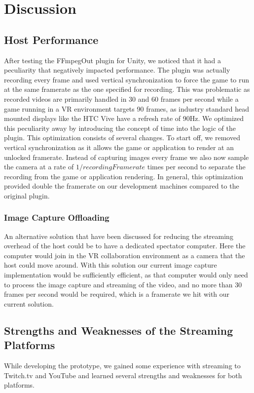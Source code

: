 \section{Discussion}
\subsection{Host Performance}
After testing the FFmpegOut plugin for Unity, we noticed that it had a peculiarity that negatively impacted performance. The plugin was actually recording every frame and used vertical synchronization to force the game to run at the same framerate as the one specified for recording. This was problematic as recorded videos are primarily handled in 30 and 60 frames per second while a game running in a VR environment targets 90 frames, as industry standard head mounted displays like the HTC Vive have a refresh rate of 90Hz\cite{vive_specs}. We optimized this peculiarity away by introducing the concept of time into the logic of the plugin. This optimization consists of several changes. To start off, we removed vertical synchronization as it allows the game or application to render at an unlocked framerate. Instead of capturing images every frame we also now sample the camera at a rate of $1/recordingFramerate$ times per second to separate the recording from the game or application rendering. In general, this optimization provided double the framerate on our development machines compared to the original plugin.  

\subsubsection{Image Capture Offloading}
An alternative solution that have been discussed for reducing the streaming overhead of the host could be to have a dedicated spectator computer. Here the computer would join in the VR collaboration environment as a camera that the host could move around. With this solution our current image capture implementation would be sufficiently efficient, as that computer would only need to process the image capture and streaming of the video, and no more than 30 frames per second would be required, which is a framerate we hit with our current solution.
    
\subsection{Strengths and Weaknesses of the Streaming Platforms}
While developing the prototype, we gained some experience with streaming to Twitch.tv and YouTube and learned several strengths and weaknesses for both platforms.

